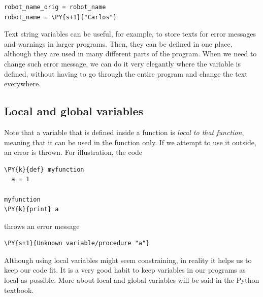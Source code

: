 \begin{bbox}
\begin{Verbatim}[commandchars=\\\{\}]
robot_name_orig = robot_name
robot_name = \PY{s+1}{"Carlos"}
\end{Verbatim}
\end{bbox}
\vspace{6mm}

\noindent
Text string variables can be useful, for example, to store texts for 
error messages and warnings in larger programs. Then, they can be 
defined in one place, although they are used in many different parts of 
the program. When we need to change such error message, we can do it 
very elegantly where the variable is defined, without having to go through 
the entire program and change the text everywhere.  

\subsection[\ \ Local and global variables]{Local and global variables}\label{subsec:karellocvar}

Note that a variable that is defined inside a function is {\em local to that function}, 
meaning that it can be used in the function only. If we attempt to use it 
outside, an error is thrown. For illustration, the code \\

\begin{bbox}
\begin{Verbatim}[commandchars=\\\{\}]
\PY{k}{def} myfunction
  a = 1

myfunction
\PY{k}{print} a  
\end{Verbatim}
\end{bbox}
\vspace{6mm}

\noindent
throws an error message \\

\begin{ybox}
\begin{Verbatim}[commandchars=\\\{\}]
\PY{s+1}{Unknown variable/procedure "a"} 
\end{Verbatim}
\end{ybox}
\vspace{6mm}

\noindent
Although using local variables might seem constraining, in reality it helps us 
to keep our code fit. It is a very good habit to keep variables in our programs 
as local as possible. More about local and global variables will be said in 
the Python textbook.

